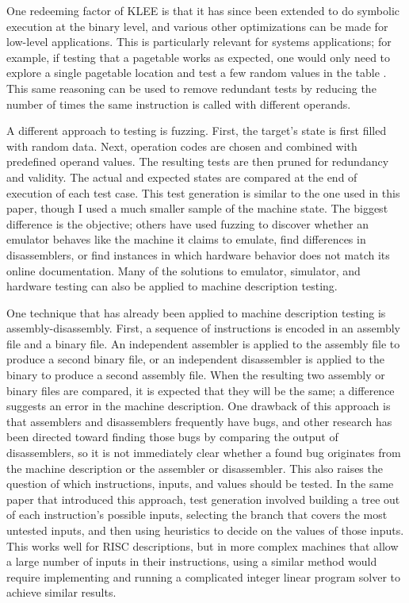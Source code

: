 \documentclass[letterpaper,12pt]{article}
\begin{document}
One redeeming factor of KLEE is that it has since been extended to do symbolic execution at the binary level, and various other optimizations can be made for low-level applications. This is particularly relevant for systems applications; for example, if testing that a pagetable works as expected, one would only need to explore a single pagetable location and test a few random values in the table \cite{Path}. This same reasoning can be used to remove redundant tests by reducing the number of times the same instruction is called with different operands.

A different approach to testing is fuzzing. First, the target's state is first filled with random data. Next, operation codes are chosen and combined with predefined operand values. The resulting tests are then pruned for redundancy and validity. The actual and expected states are compared at the end of execution of each test case. This test generation is similar to the one used in this paper, though I used a much smaller sample of the machine state. The biggest difference is the objective; others have used fuzzing to discover whether an emulator behaves like the machine it claims to emulate\cite{Emu}, find differences in disassemblers\cite{Nvd}, or find instances in which hardware behavior does not match its online documentation. Many of the solutions to emulator, simulator, and hardware testing can also be applied to machine description testing.

One technique that has already been applied to machine description testing is assembly-disassembly. First, a sequence of instructions is encoded in an assembly file and a binary file. An independent assembler is applied to the assembly file to produce a second binary file, or an independent disassembler is applied to the binary to produce a second assembly file. When the resulting two assembly or binary files are compared, it is expected that they will be the same; a difference suggests an error in the machine description. One drawback of this approach is that assemblers and disassemblers frequently have bugs, and other research has been directed toward finding those bugs by comparing the output of disassemblers\cite{Nvd}, so it is not immediately clear whether a found bug originates from the machine description or the assembler or disassembler. This also raises the question of which instructions, inputs, and values should be tested. In the same paper that introduced this approach, test generation involved building a tree out of each instruction's possible inputs, selecting the branch that covers the most untested inputs, and then using heuristics to decide on the values of those inputs\cite{Checker}. This works well for RISC descriptions, but in more complex machines that allow a large number of inputs in their instructions, using a similar method would require implementing and running a complicated integer linear program solver to achieve similar results.
\end{document}
